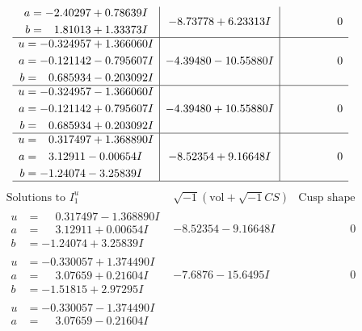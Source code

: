 \documentclass[1p]{elsarticle_modified}
\theoremstyle{definition}
\newcommand{\I}{\sqrt{-1}}
\begin{document}
$$\begin{array}{c|c|c}
\begin{aligned}
a &= -2.40297 + 0.78639 I \\
b &= \phantom{-}1.81013 + 1.33373 I\end{aligned}
 & -8.73778 + 6.23313 I & \phantom{-0.000000 } 0 \\ \hline\begin{aligned}
u &= -0.324957 + 1.366060 I \\
a &= -0.121142 - 0.795607 I \\
b &= \phantom{-}0.685934 - 0.203092 I\end{aligned}
 & -4.39480 - 10.55880 I & \phantom{-0.000000 } 0 \\ \hline\begin{aligned}
u &= -0.324957 - 1.366060 I \\
a &= -0.121142 + 0.795607 I \\
b &= \phantom{-}0.685934 + 0.203092 I\end{aligned}
 & -4.39480 + 10.55880 I & \phantom{-0.000000 } 0 \\ \hline\begin{aligned}
u &= \phantom{-}0.317497 + 1.368890 I \\
a &= \phantom{-}3.12911 - 0.00654 I \\
b &= -1.24074 - 3.25839 I\end{aligned}
 & -8.52354 + 9.16648 I & \phantom{-0.000000 } 0\\
 \hline 
 \end{array}$$\newpage$$\begin{array}{c|c|c}  
\text{Solutions to }I^u_{1}& \I (\text{vol} + \sqrt{-1}CS) & \text{Cusp shape}\\
 \hline 
\begin{aligned}
u &= \phantom{-}0.317497 - 1.368890 I \\
a &= \phantom{-}3.12911 + 0.00654 I \\
b &= -1.24074 + 3.25839 I\end{aligned}
 & -8.52354 - 9.16648 I & \phantom{-0.000000 } 0 \\ \hline\begin{aligned}
u &= -0.330057 + 1.374490 I \\
a &= \phantom{-}3.07659 + 0.21604 I \\
b &= -1.51815 + 2.97295 I\end{aligned}
 & -7.6876 - 15.6495 I & \phantom{-0.000000 } 0 \\ \hline\begin{aligned}
u &= -0.330057 - 1.374490 I \\
a &= \phantom{-}3.07659 - 0.21604 I \\

\end{aligned}
\end{array}$$
\end{document}
